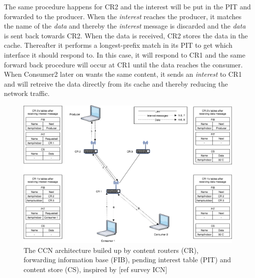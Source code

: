 The same procedure happens for CR2 and the interest will be put in the PIT and forwarded to the producer. When the \textit{interest} reaches the producer, it matches the name of the \textit{data} and thereby the \textit{interest} message is discarded and the \textit{data} is sent back towards CR2. When the data is received, CR2 stores the data in the cache. Thereafter it performs a longest-prefix match in its PIT to get which interface it should respond to. In this case, it will respond to CR1 and the same forward back procedure will occur at CR1 until the data reaches the consumer.\\
When Consumer2 later on wants the same content, it sends an \textit{interest} to CR1 and will retreive the data directly from its cache and thereby reducing the network traffic.



\begin{figure}
	\includegraphics[width=\textwidth]{figures/CCN-architecture.png}
	\caption{The CCN architecture builed up by content routers (CR), forwarding information base (FIB), pending interest table (PIT) and content store (CS), inspired by [ref survey ICN]}
	\label{fig:CCN-architecture}
\end{figure}



